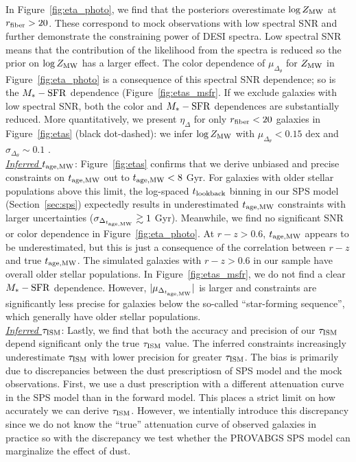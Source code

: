 In Figure~\ref{fig:eta_photo}, we find that the posteriors overestimate
$\log Z_{\rm MW}$ at $r_{\rm fiber} > 20$. 
These correspond to mock observations with low spectral SNR and further
demonstrate the constraining power of DESI spectra. 
Low spectral SNR means that the contribution of the likelihood from the spectra
is reduced so the prior on $\log Z_{\rm MW}$ has a larger effect. 
The color dependence of $\mu_{\Delta_\theta}$ for $Z_{\rm MW}$ in
Figure~\ref{fig:eta_photo} is a consequence of this spectral SNR dependence; so
is the $M_*-{\rm SFR}$ dependence (Figure~\ref{fig:etas_msfr}. 
If we exclude galaxies with low spectral SNR, both the color and $M_*-{\rm
SFR}$  dependences are substantially reduced.
More quantitatively, we present $\eta_\Delta$ for only $r_{\rm fiber} < 20$
galaxies in Figure~\ref{fig:etas} (black dot-dashed): we infer $\log Z_{\rm MW}$ with
$\mu_{\Delta_\theta}<0.15$ dex and $\sigma_{\Delta_\theta}\sim0.1$ . \\

\noindent \underline{\emph{Inferred $t_{\rm age, MW}$}}:  
Figure~\ref{fig:etas} confirms that we derive unbiased and precise constraints
on $t_{\rm age, MW}$ out to $t_{\rm age, MW} < 8$ Gyr. 
For galaxies with older stellar populations above this limit, the log-spaced
$t_{\rm lookback}$ binning in our SPS model (Section~\ref{sec:sps}) expectedly results in
underestimated  $t_{\rm age, MW}$ constraints with larger uncertainties 
($\sigma_{\Delta_{t_{\rm age, MW}}} \gtrsim 1$ Gyr). 
Meanwhile, we find no significant SNR or color dependence in
Figure~\ref{fig:eta_photo}. 
At $r - z > 0.6$, $t_{\rm age, MW}$ appears to be underestimated, but this is just a
consequence of the correlation between $r-z$ and true $t_{\rm age, MW}$. 
The simulated galaxies with $r - z > 0.6$ in our sample have overall older
stellar populations. 
In Figure~\ref{fig:etas_msfr}, we do not find a clear $M_*-{\rm SFR}$
dependence. 
However, $|\mu_{\Delta_{t_{\rm age, MW}}}|$ is larger and constraints are significantly
less precise for galaxies below the so-called ``star-forming sequence'', which
generally have older stellar populations. \\

\noindent \underline{\emph{Inferred $\tau_{\rm ISM}$}}:  
Lastly, we find that both the accuracy and precision of our $\tau_{\rm ISM}$ depend
significant only the true $\tau_{\rm ISM}$ value. 
The inferred constraints increasingly underestimate $\tau_{\rm ISM}$ with lower
precision for greater $\tau_{\rm ISM}$.
The bias is primarily due to discrepancies between the dust prescriptiosn of
SPS model and the mock observations. 
First, we use a dust prescription with a different attenuation curve in the SPS
model than in the forward model. 
This places a strict limit on how accurately we can derive $\tau_{\rm ISM}$.
However, we intentially introduce this discrepancy since we do not know the 
``true'' attenuation curve of observed galaxies in practice so with the
discrepancy we test whether the {\sc PROVABGS} SPS model can marginalize the
effect of dust. 

